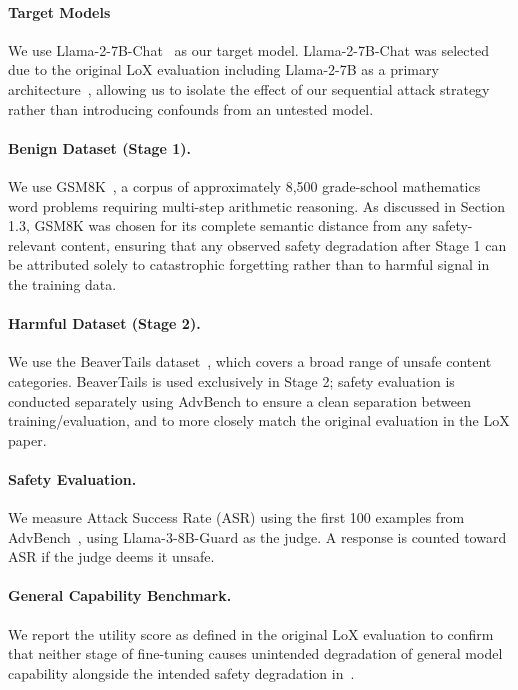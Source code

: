\documentclass[letterpaper,twocolumn,10pt]{article}
\begin{document}
\paragraph{Target Models} We use Llama-2-7B-Chat~\cite{touvron2023llama} as our target model. Llama-2-7B-Chat was selected due to the original LoX evaluation including Llama-2-7B as a primary architecture~\cite{perin2025loxlowrankextrapolationrobustifies}, allowing us to isolate the effect of our sequential attack strategy rather than introducing confounds from an untested model.

\paragraph{Benign Dataset (Stage 1).} We use GSM8K~\cite{cobbe2021training}, a corpus of approximately 8,500 grade-school mathematics word problems requiring multi-step arithmetic reasoning. As discussed in Section 1.3, GSM8K was chosen for its complete semantic distance from any safety-relevant content, ensuring that any observed safety degradation after Stage 1 can be attributed solely to catastrophic forgetting rather than to harmful signal in the training data.

\paragraph{Harmful Dataset (Stage 2).} We use the BeaverTails dataset~\cite{ji2023beavertails}, which covers a broad range of unsafe content categories. BeaverTails is used exclusively in Stage 2; safety evaluation is conducted separately using AdvBench to ensure a clean separation between training/evaluation, and to more closely match the original evaluation in the LoX paper.

\paragraph{Safety Evaluation.} We measure Attack Success Rate (ASR) using the first 100 examples from AdvBench~\cite{zou2023universal}, using Llama-3-8B-Guard as the judge. A response is counted toward ASR if the judge deems it unsafe.

\paragraph{General Capability Benchmark.} We report the utility score as defined in the original LoX evaluation to confirm that neither stage of fine-tuning causes unintended degradation of general model capability alongside the intended safety degradation in~\cite{perin2025loxlowrankextrapolationrobustifies}.
\end{document}
